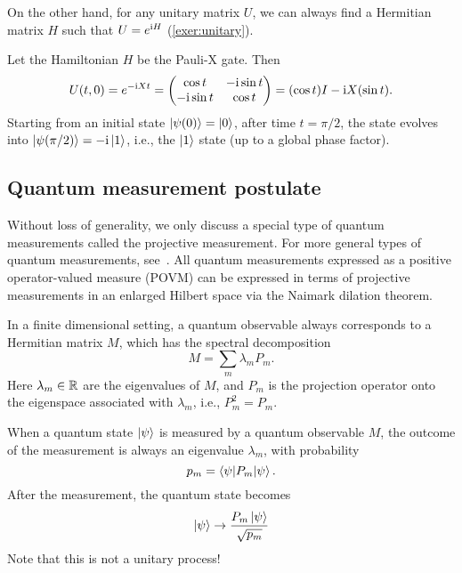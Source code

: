 On the other hand, for any unitary matrix $U$, we can always find a Hermitian matrix $H$ such that $U=e^{\mathrm{i} H}$ (\cref{exer:unitary}).

\begin{exam}
Let the Hamiltonian $H$ be the Pauli-X gate. Then 
\begin{equation}
U(t,0)=e^{-\mathrm{i} Xt}=
\begin{pmatrix}
\cos t & -\mathrm{i} \sin t\\
-\mathrm{i} \sin t & \cos t
\end{pmatrix}=(\cos t)I-\mathrm{i} X (\sin t).
\end{equation}
Starting from an initial state $\ket{\psi(0)}=\ket{0}$, after time $t=\pi/2$, the state evolves into $\ket{\psi(\pi/2)}=-\mathrm{i} \ket{1}$, i.e., the $\ket{1}$ state (up to a global phase factor).
\end{exam}

\subsection{Quantum measurement postulate}

Without loss of generality, we only discuss a special type of quantum measurements called the projective measurement. 
For more general types of quantum measurements, see~\cite[Section 2.2.3]{NielsenChuang2000}.
All quantum measurements expressed as a positive operator-valued measure (POVM) can be expressed in terms of projective measurements in an enlarged Hilbert space via the Naimark dilation theorem.

In a finite dimensional setting, a quantum observable always corresponds to a Hermitian matrix $M$, which has the spectral decomposition
\begin{equation}
M=\sum_{m} \lambda_m P_m.
  \label{eqn:M_observable}
\end{equation}
Here $\lambda_m\in\mathbb{R}$ are the eigenvalues of $M$, and $P_m$ is the projection operator onto the eigenspace associated with $\lambda_m$, i.e., $P_m^2=P_m$. 

When a quantum state $\ket{\psi}$ is measured by a quantum observable $M$, the outcome of the measurement is always an eigenvalue $\lambda_m$, with probability 
\begin{equation}
p_m=\braket{\psi|P_m|\psi}.
\end{equation}
After the measurement, the quantum state becomes
\begin{equation}
\ket{\psi}\to \frac{P_m \ket{\psi}}{\sqrt{p_m}}
\end{equation} 
Note that this is not a unitary process!

